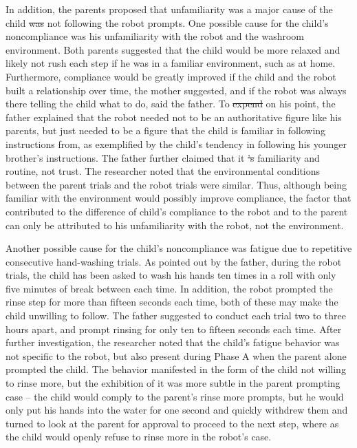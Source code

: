 \documentclass{ut-thesis}
\providecommand{\DIFaddtex}[1]{{\protect\color{blue}\uwave{#1}}} %
\providecommand{\DIFdeltex}[1]{{\protect\color{red}\sout{#1}}}                      %
\providecommand{\DIFaddbegin}{} %
\providecommand{\DIFaddend}{} %
\providecommand{\DIFdelbegin}{} %
\providecommand{\DIFdelend}{} %
\providecommand{\DIFadd}[1]{\texorpdfstring{\DIFaddtex{#1}}{#1}} %
\providecommand{\DIFdel}[1]{\texorpdfstring{\DIFdeltex{#1}}{}} %
\begin{document}
In addition, the parents proposed that unfamiliarity was a major cause of the child \DIFdelbegin \DIFdel{was }\DIFdelend not following the robot prompts.  One possible cause for the child's noncompliance was his unfamiliarity with the robot and the washroom environment.  Both parents suggested that the child would be more relaxed and likely not rush each step if he was in a familiar environment, such as at home.  Furthermore, compliance would be greatly improved if the child and the robot built a relationship over time, the mother suggested, and if the robot was always there telling the child what to do, said the father.  To \DIFdelbegin \DIFdel{expend }\DIFdelend \DIFaddbegin \DIFadd{expand }\DIFaddend on his point, the father explained that the robot needed not to be an authoritative figure like his parents, but just needed to be a figure that the child is familiar in following instructions from, as exemplified by the child's tendency in following his younger brother's instructions.  The father further claimed that it \DIFdelbegin \DIFdel{'s }\DIFdelend \DIFaddbegin \DIFadd{was }\DIFaddend familiarity and routine, not trust.  The researcher noted that the environmental conditions between the parent trials and the robot trials were similar.  Thus, although being familiar with the environment would possibly improve compliance, the factor that contributed to the difference of child's compliance to the robot and to the parent can only be attributed to his unfamiliarity with the robot, not the environment.

Another possible cause for the child's noncompliance was fatigue due to repetitive consecutive hand-washing trials.  As pointed out by the father, during the robot trials, the child has been asked to wash his hands ten times in a roll with only five minutes of break between each time.  In addition, the robot prompted the rinse step for more than fifteen seconds each time, both of these may make the child unwilling to follow.  The father suggested to conduct each trial two to three hours apart, and prompt rinsing for only ten to fifteen seconds each time.  After further investigation, the researcher noted that the child's fatigue behavior was not specific to the robot, but also present during Phase A when the parent alone prompted the child.  The behavior manifested in the form of the child not willing to rinse more, but the exhibition of it was more subtle in the parent prompting case -- the child would comply to the parent's rinse more prompts, but he would only put his hands into the water for one second and quickly withdrew them and turned to look at the parent for approval to proceed to the next step, where as the child would openly refuse to rinse more in the robot's case.
\end{document}
